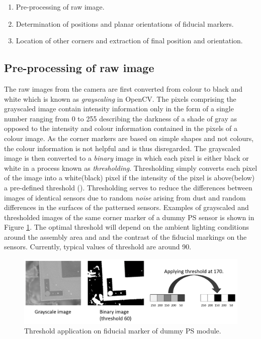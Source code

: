 \begin{enumerate}
\setlength\itemsep{-0.5em}
\item Pre-processing of raw image.
\item Determination of positions and planar orientations of fiducial markers.
\item Location of other corners and extraction of final position and orientation.
\end{enumerate}

\subsection{Pre-processing of raw image}
The raw images from the camera are first converted from colour to black and white which is known as \emph{grayscaling} in OpenCV. The pixels comprising the grayscaled image contain intensity information only in the form of a single number ranging from 0 to 255 describing the darkness of a shade of gray as opposed to the intensity and colour information contained in the pixels of a colour image. As the corner markers are based on simple shapes and not colours, the colour information is not helpful and is thus disregarded. The grayscaled image is then converted to a \emph{binary} image in which each pixel is either black or white in a process known as \emph{thresholding}. Thresholding simply converts each pixel of the image into a white(black) pixel if the intensity of the pixel is above(below) a pre-defined threshold (). Thresholding serves to reduce the differences between images of identical sensors due to random \emph{noise} arising from dust and random differences in the surfaces of the patterned sensors. Examples of grayscaled and thresholded images of the same corner marker of a dummy PS sensor is shown in Figure \ref{fig:threshold}. The optimal threshold will depend on the ambient lighting conditions around the assembly area and and the contrast of the fiducial markings on the sensors. Currently, typical values of threshold are around 90.

\begin{figure}[ht]\centering
\includegraphics[width=0.9\linewidth]{Data/Control_Software/Threshold.png}
\caption{Threshold application on fiducial marker of dummy PS module.}
\label{fig:threshold}
\end{figure}

